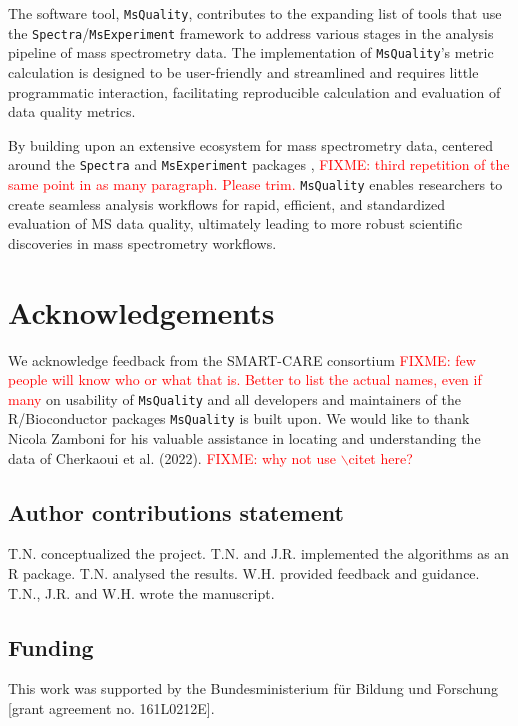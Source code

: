 \documentclass{bioinfo}
\newcommand{\fixme}[1]{\textcolor{red}{FIXME: #1}}
\begin{document}
The software tool, \texttt{MsQuality}, contributes to the expanding list of 
tools that use the \texttt{Spectra}/\texttt{MsExperiment} framework to address 
various stages in the analysis pipeline of mass spectrometry data.
The implementation of \texttt{MsQuality}'s metric calculation is designed
to be user-friendly and streamlined and requires little programmatic 
interaction, facilitating reproducible calculation and evaluation of data 
quality metrics.

By building upon an extensive ecosystem for mass spectrometry data, centered
around the \texttt{Spectra} and \texttt{MsExperiment} packages \citep{Rainer2022},  \fixme{third repetition of the same point in as many paragraph. Please trim.}
\texttt{MsQuality} enables researchers to create seamless analysis workflows 
for rapid, efficient, and standardized evaluation of MS data quality, 
ultimately leading to more robust scientific discoveries in mass spectrometry
workflows.


\section{Acknowledgements}

We acknowledge feedback from the SMART-CARE consortium \fixme{few people will know who or what that is. Better to list the actual names, even if many} on usability of 
\texttt{MsQuality} and all developers and maintainers of the R/Bioconductor 
packages \texttt{MsQuality} is built upon. We would like to thank Nicola Zamboni
for his valuable assistance in locating and understanding the data of Cherkaoui et al. (2022). \fixme{why not use $\backslash$citet here?}

\subsection{Author contributions statement}

T.N. conceptualized the project. T.N. and J.R. implemented the algorithms as an R
package. T.N. analysed the results. W.H. provided feedback and guidance. T.N., J.R. and
W.H. wrote the manuscript.

\subsection{Funding}

This work was supported by the Bundesministerium für Bildung und Forschung 
[grant agreement no. 161L0212E].
\end{document}
